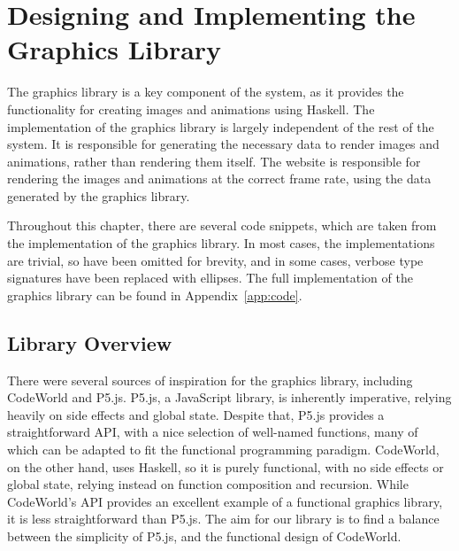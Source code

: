 \documentclass[../main.tex]{subfiles}
\begin{document}
\chapter{Designing and Implementing the Graphics Library} \label{ch:graphics}
    The graphics library is a key component of the system, as it provides the
        functionality for creating images and animations using Haskell.
    The implementation of the graphics library is largely independent of the rest
        of the system.
    It is responsible for generating the necessary data to render images and
        animations, rather than rendering them itself.
    The website is responsible for rendering the images and animations at the
        correct frame rate, using the data generated by the graphics library.

    Throughout this chapter, there are several code snippets, which are taken from
        the implementation of the graphics library.
    In most cases, the implementations are trivial, so have been omitted for
        brevity, and in some cases, verbose type signatures have been replaced with
        ellipses.
    The full implementation of the graphics library can be found in
        Appendix~\ref{app:code}.

    \section{Library Overview}
        There were several sources of inspiration for the graphics library, including
            CodeWorld and P5.js.
        P5.js, a JavaScript library, is inherently imperative, relying heavily on side
            effects and global state.
        Despite that, P5.js provides a straightforward API, with a nice selection of
            well-named functions, many of which can be adapted to fit the functional
            programming paradigm.
        CodeWorld, on the other hand, uses Haskell, so it is purely functional, with no
            side effects or global state, relying instead on function composition and
            recursion.
        While CodeWorld's API provides an excellent example of a functional graphics
            library, it is less straightforward than P5.js.
        The aim for our library is to find a balance between the simplicity of P5.js,
            and the functional design of CodeWorld.
\end{document}
